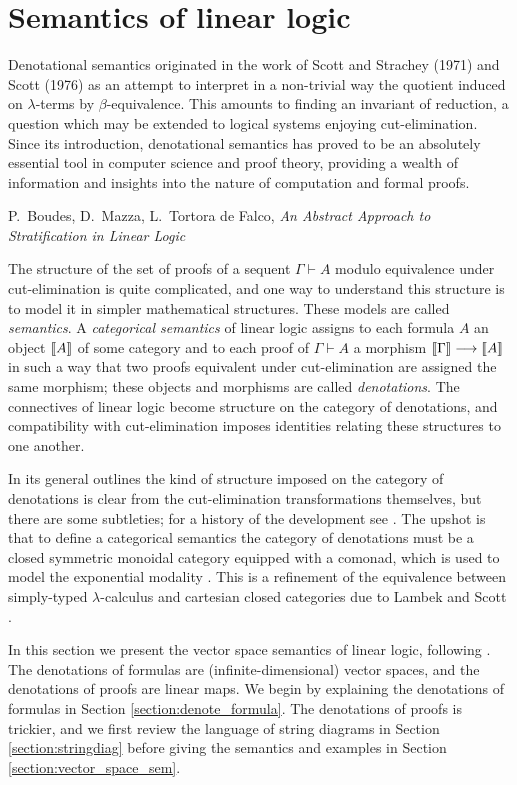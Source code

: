 \documentclass[english,letter paper,12pt,reqno]{article}
\theoremstyle{example}
\begin{document}
\section{Semantics of linear logic}\label{section:diagrammatics}

\setlength{\epigraphwidth}{0.8\textwidth}
\epigraph{Denotational semantics originated in the work of Scott and Strachey (1971) and Scott (1976) as an attempt to interpret in a non-trivial way the quotient induced on $\lambda$-terms by $\beta$-equivalence. This amounts to finding an invariant of reduction, a question which may be extended to logical systems enjoying cut-elimination. Since its introduction, denotational semantics has proved to be an absolutely essential tool in computer science and proof theory, providing a wealth of information and insights into the nature of computation and formal proofs.}{P.~Boudes, D.~Mazza, L.~Tortora de Falco, \textit{An Abstract Approach to Stratification in Linear Logic}}

The structure of the set of proofs of a sequent $\Gamma \vdash A$ modulo equivalence under cut-elimination is quite complicated, and one way to understand this structure is to model it in simpler mathematical structures. These models are called \emph{semantics}. A \emph{categorical semantics} of linear logic \cite{mellies, blue_book} assigns to each formula $A$ an object $\llbracket A \rrbracket$ of some category and to each proof of $\Gamma \vdash A$ a morphism $\llbracket \Gamma \rrbracket \longrightarrow \llbracket A \rrbracket$ in such a way that two proofs equivalent under cut-elimination are assigned the same morphism; these objects and morphisms are called \emph{denotations}. The connectives of linear logic become structure on the category of denotations, and compatibility with cut-elimination imposes identities relating these structures to one another.

In its general outlines the kind of structure imposed on the category of denotations is clear from the cut-elimination transformations themselves, but there are some subtleties; for a history of the development see \cite{mellies}. The upshot is that to define a categorical semantics the category of denotations must be a closed symmetric monoidal category equipped with a comonad, which is used to model the exponential modality \cite[\S 7]{mellies}. This is a refinement of the equivalence between simply-typed $\lambda$-calculus and cartesian closed categories due to Lambek and Scott \cite{lambek}. 

In this section we present the vector space semantics of linear logic, following \cite[p.5]{hyland}. The denotations of formulas are (infinite-dimensional) vector spaces, and the denotations of proofs are linear maps. We begin by explaining the denotations of formulas in Section \ref{section:denote_formula}. The denotations of proofs is trickier, and we first review the language of string diagrams in Section \ref{section:stringdiag} before giving the semantics and examples in Section \ref{section:vector_space_sem}.
\end{document}
